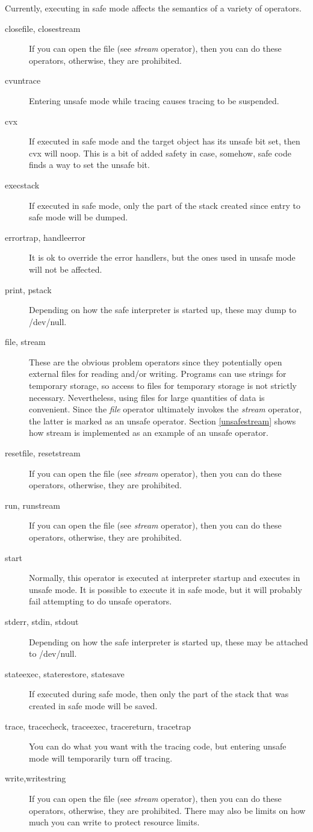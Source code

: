 Currently, executing in safe mode affects the semantics
of a variety of operators.
\begin{description}
\item[closefile, closestream]
If you can open the file (see {\em stream} operator),
then you can do these operators,
otherwise, they are prohibited.
\item[cvuntrace]
Entering unsafe mode while tracing causes tracing to be suspended.
\item[cvx]
If executed in safe mode and the target object has its
unsafe bit set, then cvx will noop.
This is a bit of added safety in case, somehow, safe code
finds a way to set the unsafe bit.
\item[execstack]
If executed in safe mode,
only the part of the stack created since entry to safe mode
will be dumped.
\item[errortrap, handleerror]
It is ok to override the error handlers, but the ones used
in unsafe mode will not be affected.
\item[print, pstack]
Depending on how the safe interpreter is started up, these may
dump to /dev/null.
\item[file, stream]
These are the obvious problem operators since they potentially
open external files for reading and/or writing.
Programs can use strings for temporary storage,
so access to files for temporary storage is not strictly
necessary.  Nevertheless, using files for large quantities of data
is convenient.
Since the {\em file} operator ultimately invokes the {\em stream}
operator, the latter is marked as an unsafe operator.
Section \ref{unsafestream} shows how stream is implemented as an example
of an unsafe operator.
\item[resetfile, resetstream]
If you can open the file (see {\em stream} operator),
then you can do these operators,
otherwise, they are prohibited.
\item[run, runstream]
If you can open the file (see {\em stream} operator),
then you can do these operators,
otherwise, they are prohibited.
\item[start]
Normally, this operator is executed at interpreter startup
and executes in unsafe mode.  It is possible to execute it
in safe mode, but it will probably fail attempting
to do unsafe operators.
\item[stderr, stdin, stdout]
Depending on how the safe interpreter is started up, these may
be attached to /dev/null.
\item[stateexec, staterestore, statesave]
If executed during safe mode, then only the part of the stack
that was created in safe mode will be saved.
\item[trace, tracecheck, traceexec, tracereturn, tracetrap]
You can do what you want with the tracing code, but entering
unsafe mode will temporarily turn off tracing.
\item[write,writestring]
If you can open the file (see {\em stream} operator),
then you can do these operators,
otherwise, they are prohibited.
There may also be limits on how much you can write to protect resource
limits.
\end{description}

